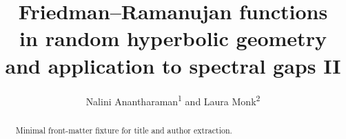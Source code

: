 \documentclass{amsart}
\title[Friedman--Ramanujan functions in random hyperbolic geometry II]{Friedman--Ramanujan functions \protect\\ in random hyperbolic geometry \protect\\ and application to spectral gaps II}
\author{Nalini Anantharaman\textsuperscript{1} and Laura Monk\textsuperscript{2}}
\begin{document}
\maketitle

\begin{abstract}
  Minimal front-matter fixture for title and author extraction.
\end{abstract}
\end{document}
